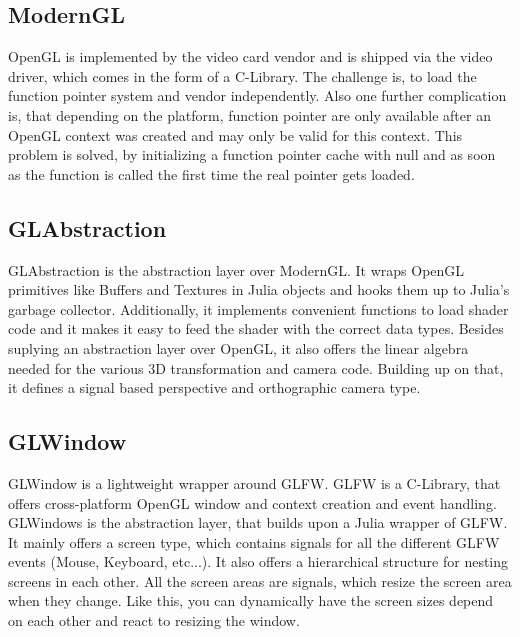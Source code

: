 \subsection{ModernGL}
\ac{OpenGL} is implemented by the video card vendor and is shipped via the video driver, which comes in the form of a C-Library.
The challenge is, to load the function pointer system and vendor independently. Also one further complication is, that depending on the platform, function pointer are only available after an \ac{OpenGL} context was created and may only be valid for this context. \cite{wgl}
This problem is solved, by initializing a function pointer cache with null and as soon as the function is called the first time the real pointer gets loaded. 


\subsection{GLAbstraction}
GLAbstraction is the abstraction layer over ModernGL.
It wraps \ac{OpenGL} primitives like Buffers and Textures in Julia objects and hooks them up to Julia's garbage collector.
Additionally, it implements convenient functions to load shader code and it makes it easy to feed the shader with the correct data types.
Besides suplying an abstraction layer over \ac{OpenGL}, it also offers the linear algebra needed for the various 3D transformation and camera code.
Building up on that, it defines a signal based perspective and orthographic camera type.


\subsection{GLWindow}
GLWindow is a lightweight wrapper around GLFW. GLFW is a C-Library, that offers cross-platform \ac{OpenGL} window and context creation and event handling.
GLWindows is the abstraction layer, that builds upon a Julia wrapper of GLFW.
It mainly offers a screen type, which contains signals for all the different GLFW events (Mouse, Keyboard, etc...). 
It also offers a hierarchical structure for nesting screens in each other. 
All the screen areas are signals, which resize the screen area when they change. Like this, you can dynamically have the screen sizes depend on each other and react to resizing the window.



